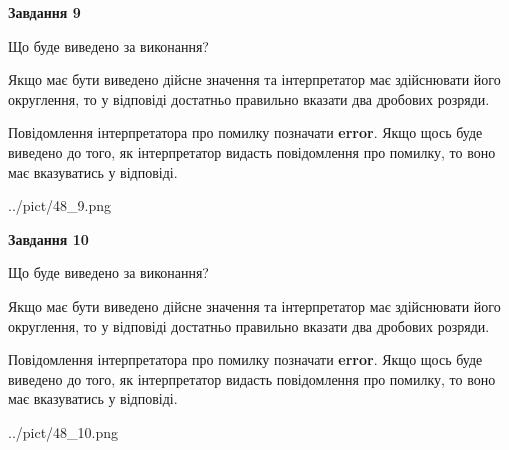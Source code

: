 \documentclass[12pt, ukrainian]{article}
\begin{document}
{\begin {Large}
{\begin {center}\textbf{Завдання 9}\end {center}}\par
Що буде виведено за виконання? \par

Якщо має бути виведено дійсне значення та інтерпретатор має здійснювати його округлення, 
то у відповіді достатньо правильно вказати два дробових розряди.

Повідомлення інтерпретатора про помилку позначати \textbf{error}.
Якщо щось буде виведено до того, як інтерпретатор видасть повідомлення про помилку, 
то воно має вказуватись у відповіді. \par

\begin{center}
	{../pict/48_9.png}
\end{center}
\newpage

{\begin {center}\textbf{Завдання 10}\end {center}}\par
Що буде виведено за виконання? \par

Якщо має бути виведено дійсне значення та інтерпретатор має здійснювати його округлення, 
то у відповіді достатньо правильно вказати два дробових розряди.

Повідомлення інтерпретатора про помилку позначати \textbf{error}.
Якщо щось буде виведено до того, як інтерпретатор видасть повідомлення про помилку, 
то воно має вказуватись у відповіді. \par

\begin{center}
	{../pict/48_10.png}
\end{center}
\newpage

\end {Large}}
\end{document}
